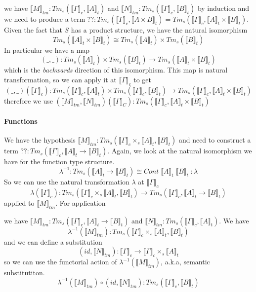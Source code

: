 \documentclass[12pt]{article}
\theoremstyle{definition}
\newcommand{\den}[1]{\llbracket #1 \rrbracket}
\begin{document}
\begin{prooftree}
\end{prooftree}
we have $\den{M}_{tm} : Tm_s(\den{\Gamma}_c,\den{A}_t)$ and $\den{N}_{tm} : Tm_s(\den{\Gamma}_c,\den{B}_t)$ by induction and we need to produce a term $?? : Tm_s(\den{\Gamma}_c,\den{A \times B}_t) =  Tm_s(\den{\Gamma}_c,\den{A}_t \times \den{B}_t)$. Given the fact that $S$ has a product structure, we have the natural isomorphism 
\[
  Tm_s(\den{A}_t \times \den{B}_t) \cong Tm_s(\den{A}_t) \times Tm_s(\den{B}_t)  
\]
In particular we have a map 
\[
  (\_,\_) : Tm_s(\den{A}_t)\times Tm_s(\den{B}_t) \to Tm_s(\den{A}_t \times \den{B}_t)  
\]
which is the \textit{backwards} direction of this isomorphism. This map is natural transformation, so we can apply it at $\den{\Gamma}_c$ to get
\[
  (\_,\_)({\den{\Gamma}_c}) : Tm_s(\den{\Gamma}_c,\den{A}_t)\times Tm_s(\den{\Gamma}_c,\den{B}_t) \to Tm_s(\den{\Gamma}_c,\den{A}_t \times \den{B}_t)  
\]
therefore we use $(\den{M}_{tm}, \den{N}_{tm})({\den{\Gamma}_C}) : Tm_s(\den{\Gamma}_c,\den{A}_t \times \den{B}_t)$

\paragraph{Functions}
\begin{prooftree}
\end{prooftree}
We have the hypothesis $\den{M}_{tm} : Tm_s(\den{\Gamma}_c \times_s \den{A}_t, \den{B}_t )$ and need to construct a term $?? : Tm_s(\den{\Gamma}_c , \den{A}_t \to \den{B}_t)$.  Again, we look at the natural isomorphism we have for the function type structure. 
\[
 \lambda^{-1} : Tm_s(\den{A}_t \to \den{B}_t) \cong Cont\;\den{A}_t\;\den{B}_t \; : \lambda    
\]
So we can use the natural transformation $\lambda$ at $\den{\Gamma}_c$ 
\[
  \lambda(\den{\Gamma}_c) :   Tm_s(\den{\Gamma}_c \times_s \den{A}_t, \den{B}_t ) \to Tm_s(\den{\Gamma}_c , \den{A}_t \to \den{B}_t) 
\]
applied to $\den{M}_{tm}$.
For application 
\begin{prooftree}
\end{prooftree}
we have $\den{M}_{tm} : Tm_s(\den{\Gamma}_c, \den{A}_t \to \den{B}_t)$ and $\den{N}_{tm} : Tm_s(\den{\Gamma}_c, \den{A}_t)$. We have 
\[
  \lambda^{-1}(\den{M}_{tm}) : Tm_s(\den{\Gamma}_c \times_s \den{A}_t, \den{B}_t)   
\]
and we can define a substitution
\[
 (id, \den{N}_{tm}) : \den{\Gamma}_c \to \den{\Gamma}_c \times_s \den{A}_t    
\]
so we can use the functorial action of $\lambda^{-1}(\den{M}_{tm})$, a.k.a, semantic substitutiton. 
\[
    \lambda^{-1}(\den{M}_{tm}) \circ (id, \den{N}_{tm}) : Tm_s(\den{\Gamma}_c, \den{B}_t)
\]
\end{document}
